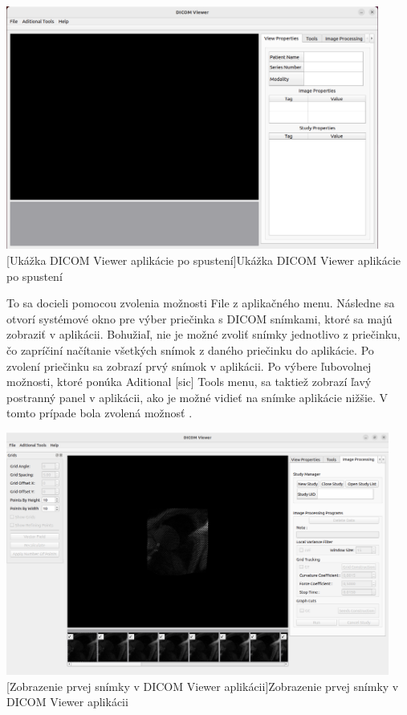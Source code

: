 {\clearpage

\begin {center}
        \centering
        \includegraphics[height=8cm]{media/existing_app/init.png}
        \captionsetup{justification=centering}
        [Ukážka DICOM Viewer aplikácie po spustení]{Ukážka DICOM Viewer aplikácie po spustení}
\end {center}

To sa docieli pomocou zvolenia možnosti File  z aplikačného menu. Následne sa otvorí systémové okno pre výber priečinka s DICOM snímkami, ktoré sa majú zobraziť v aplikácii. Bohužiaľ, nie je možné zvoliť snímky jednotlivo z priečinku, čo zapríčiní načítanie všetkých snímok z daného priečinku do aplikácie. Po zvolení priečinku sa zobrazí prvý snímok v aplikácii. Po výbere ľubovolnej možnosti, ktoré ponúka Aditional [sic] Tools menu, sa taktiež zobrazí ľavý postranný panel v aplikácii, ako je možné vidieť na snímke aplikácie nižšie. V tomto prípade bola zvolená možnosť .

\begin {center}
        \centering
        \includegraphics[height=8cm]{media/existing_app/app_with_grids_panel.png}
        \captionsetup{justification=centering}
        [Zobrazenie prvej snímky v DICOM Viewer aplikácii]{Zobrazenie prvej snímky v DICOM Viewer aplikácii}
\end {center}

}
